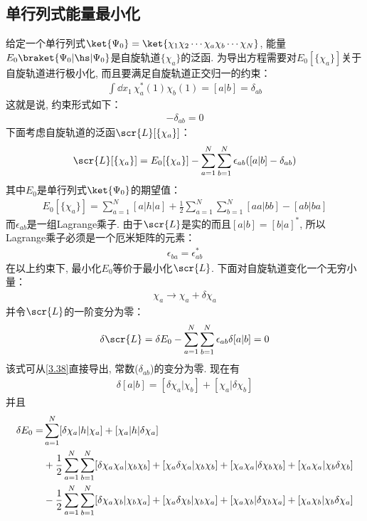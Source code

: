 \subsection{单行列式能量最小化}
给定一个单行列式$\ket{\Psi_0} = \ket{\chi_1\chi_2\cdots\chi_a\chi_b\cdots\chi_N}$, 
能量$E_0\braket{\Psi_0|\hs|\Psi_0}$是自旋轨道$\{\chi_a\}$的泛函. 
为导出\hft 方程需要对$E_0[\{\chi_a \}]$关于自旋轨道进行极小化, 
而且要满足自旋轨道正交归一的约束：
\begin{align}
	\int\dd{x}_1\,\chi_a^*(1)\chi_b(1) = [a|b] = \delta_{ab}
\end{align}
这就是说, 
约束形式如下：
\begin{align}
	[a|b] - \delta_{ab} = 0
\end{align}
下面考虑自旋轨道的泛函$\scr{L}[\{\chi_a \}]$：
\begin{align}
	\label{3.38}
	\scr{L}[\{\chi_a \}] = E_0[\{\chi_a\}] - \sum_{a=1}^{N}\sum_{b=1}^{N}\epsilon_{ab}([a|b]-\delta_{ab})
\end{align}
其中$E_0$是单行列式$\ket{\Psi_0}$的期望值：
\begin{align}
	E_0[\{\chi_a\}] = \sum_{a=1}^{N}[a|h|a] + \frac{1}{2}\sum_{a=1}^{N}\sum_{b=1}^{N}[aa|bb]- [ab|ba]
\end{align}
而$\epsilon_{ab}$是一组Lagrange乘子. 
由于$\scr{L}$是实的而且$[a|b]=[b|a]^*$, 
所以Lagrange乘子必须是一个厄米矩阵的元素：
\begin{align}
	\label{3.40}
	\epsilon_{ba} = \epsilon_{ab}^*
\end{align}
在以上约束下, 
最小化$E_0$等价于最小化$\scr{L}$. 
下面对自旋轨道变化一个无穷小量：
\begin{align}
	\chi_a \to \chi_a+\delta\chi_a
\end{align}
并令$\scr{L}$的一阶变分为零：
\begin{align}
	\label{3.42}
	\delta\scr{L} = \delta E_0 - \sum_{a=1}^{N}\sum_{b=1}^{N}\epsilon_{ab}\delta[a|b] = 0
\end{align}
该式可从\autoref{3.38}直接导出, 
常数($\delta_{ab}$)的变分为零. 
现在有
\begin{align}
	\delta[a|b] = [\delta\chi_a|\chi_b] + [\chi_a|\delta\chi_b]
\end{align}
并且
\begin{align}
	\delta E_0 = & \sum_{a=1}^{N}[\delta\chi_a|h|\chi_a] + [\chi_a|h|\delta\chi_a]\notag\\
	& + \frac{1}{2}\sum_{a=1}^{N}\sum_{b=1}^{N}[\delta\chi_a\chi_a|\chi_b\chi_b] + [\chi_a\delta\chi_a|\chi_b\chi_b] + [\chi_a\chi_a|\delta\chi_b\chi_b] + [\chi_a\chi_a|\chi_b\delta\chi_b]\notag\\
	& - \frac{1}{2}\sum_{a=1}^{N}\sum_{b=1}^{N}[\delta\chi_a\chi_b|\chi_b\chi_a] + [\chi_a\delta\chi_b|\chi_b\chi_a] + [\chi_a\chi_b|\delta\chi_b\chi_a] + [\chi_a\chi_b|\chi_b\delta\chi_a]
\end{align}
